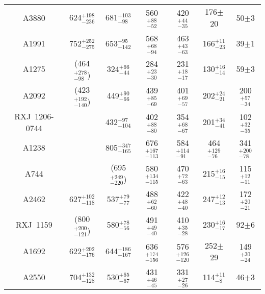 \begin{table}
\begin{center}
{\begin{tabular}{ccccccc}
    A3880 & 624$^{+198}_{-236}$ & 681$^{+103}_{-98}$ & 560$^{+88}_{-52}$ & 420$^{+44}_{-35}$ & 176$\pm$20 & 50$\pm$3 \\
    A1991 & 752$^{+252}_{-275}$ & 653$^{+95}_{-142}$ & 568$^{+68}_{-94}$ & 463$^{+43}_{-63}$ & 166$^{+11}_{-23}$ & 39$\pm$1 \\
    A1275 & (464$^{+278}_{-98}$) & 324$^{+66}_{-44}$ & 284$^{+23}_{-30}$ & 231$^{+18}_{-17}$ & 130$^{+16}_{-14}$ & 59$\pm$3 \\
    A2092 & (423$^{+192}_{-140}$) & 449$^{+90}_{-66}$ & 439$^{+85}_{-69}$ & 401$^{+69}_{-57}$ & 202$^{+24}_{-21}$ & 200$^{+57}_{-34}$ \\
    RXJ~1206-0744 & & 432$^{+97}_{-104}$ & 402$^{+88}_{-80}$ & 354$^{+68}_{-67}$ & 201$^{+34}_{-41}$ & 102$^{+32}_{-35}$ \\
    A1238 &         & 805$^{+347}_{-165}$ & 676$^{+167}_{-113}$ & 584$^{+114}_{-91}$ & 464$^{+129}_{-76}$ & 341$^{+200}_{-78}$ \\
    A744 &             & (695$^{+249}_{-220}$) & 580$^{+134}_{-115}$ & 470$^{+72}_{-63}$ & 215$^{+16}_{-15}$ & 115$^{+12}_{-11}$ \\
    A2462 & 627$^{+102}_{-118}$ & 537$^{+79}_{-77}$ & 488$^{+62}_{-60}$ & 422$^{+48}_{-40}$ & 247$^{+12}_{-13}$ & 172$^{+20}_{-21}$ \\
    RXJ~1159 & (800$^{+200}_{-121}$) & 580$^{+78}_{-56}$ & 491$^{+49}_{-40}$ & 410$^{+35}_{-28}$ & 230$^{+16}_{-17}$ & 92$\pm$6 \\
    A1692 & 622$^{+202}_{-176}$ & 644$^{+186}_{-167}$ & 636$^{+174}_{-156}$ & 576$^{+126}_{-120}$ & 252$\pm$29 & 149$^{+30}_{-24}$ \\
    A2550 & 704$^{+132}_{-128}$ & 530$^{+65}_{-67}$ & 431$^{+46}_{-45}$ & 331$^{+27}_{-26}$ & 114$^{+11}_{-8}$ & 46$\pm$3 \\
    
    \hline \hline
    \end{tabular}}
    \vspace{-1.2cm}
    \begin{flushleft}
    \leftskip 35pt
    \end{flushleft}
    \end{center}
\end{table} 
